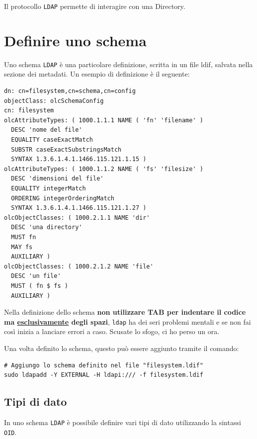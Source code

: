 \documentclass[a4paper]{report}
\newenvironment{ricordati}{\begin{tcolorbox}[fonttitle=\sffamily\bfseries\large,title=Ricordati,colframe=orange!75!white]}{\end{tcolorbox}}
\newenvironment{code}{\begin{tcolorbox}[size=small]}{\end{tcolorbox}}
\begin{document}
Il protocollo \texttt{LDAP} permette di interagire con una Directory.

\section{Definire uno schema}
\label{sec:schema}

Uno schema \texttt{LDAP} è una particolare definizione, scritta in un file ldif, salvata nella sezione dei metadati. Un esempio di definizione è il seguente:

\begin{code}
\begin{lstlisting}
dn: cn=filesystem,cn=schema,cn=config
objectClass: olcSchemaConfig
cn: filesystem
olcAttributeTypes: ( 1000.1.1.1 NAME ( 'fn' 'filename' )
  DESC 'nome del file'
  EQUALITY caseExactMatch
  SUBSTR caseExactSubstringsMatch
  SYNTAX 1.3.6.1.4.1.1466.115.121.1.15 )
olcAttributeTypes: ( 1000.1.1.2 NAME ( 'fs' 'filesize' )
  DESC 'dimensioni del file'
  EQUALITY integerMatch
  ORDERING integerOrderingMatch
  SYNTAX 1.3.6.1.4.1.1466.115.121.1.27 )
olcObjectClasses: ( 1000.2.1.1 NAME 'dir'
  DESC 'una directory'
  MUST fn
  MAY fs
  AUXILIARY )
olcObjectClasses: ( 1000.2.1.2 NAME 'file'
  DESC 'un file'
  MUST ( fn $ fs )
  AUXILIARY )
\end{lstlisting}
\end{code}

\begin{ricordati}
	Nella definizione dello schema \textbf{non utilizzare TAB per indentare il codice ma \underline{esclusivamente} degli spazi}, \texttt{ldap} ha dei seri problemi mentali e se non fai così inizia a lanciare errori a caso. Scusate lo sfogo, ci ho perso un ora.
\end{ricordati}

Una volta definito lo schema, questo può essere aggiunto tramite il comando:

\begin{code}
\begin{lstlisting}
# Aggiungo lo schema definito nel file "filesystem.ldif"
sudo ldapadd -Y EXTERNAL -H ldapi:/// -f filesystem.ldif 
\end{lstlisting}
\end{code}

\subsection{Tipi di dato}

In uno schema \texttt{LDAP} è possibile definire vari tipi di dato utilizzando la sintassi \texttt{OID}.
\end{document}
